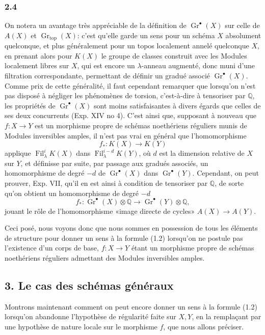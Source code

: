 \documentclass[11pt]{article}
\newcommand{\Gr}{\operatorname{Gr}}
\newcommand{\Fil}{\operatorname{Fil}}
\begin{document}
\subsubsection*{2.4}
On notera un avantage très appréciable de la définition de $\Gr^\bullet(X)$ sur celle de $A(X)$ et $\Gr_{\mathrm{top}}(X)$: c'est qu'elle garde un sens pour un schéma $X$ absolument quelconque, et plus généralement pour un topos localement annelé quelconque $X$, en prenant alors pour $K(X)$ le groupe de classes construit avec les Modules localement libres sur $X$, qui est encore un $\lambda$-anneau augmenté, donc muni d'une filtration correspondante, permettant de définir un gradué associé $\Gr^\bullet(X)$. Comme prix de cette généralité, il faut cependant remarquer que lorsqu'on n'est pas disposé à négliger les phénomènes de torsion, c'est-à-dire à tensoriser par $\mathbb Q$, les propriétés de $\Gr^\bullet(X)$ sont moins satisfaisantes à divers égards que celles de ses deux concurrents (Exp. XIV no 4). C'est ainsi que, supposant à nouveau que $f:X\to Y$ est un morphisme propre de schémas noethériens réguliers munis de Modules inversibles amples, il n'est pas vrai en général que l'homomorphisme
\[
f_*:K(X)\longrightarrow K(Y)
\]
applique $\Fil^i_\lambda K(X)$ dans $\Fil^{i-d}_\lambda K(Y)$, où $d$ est la dimension relative de $X$ sur $Y$, et définisse par suite, par passage aux gradués associés, un homomorphisme de degré $-d$ de $\Gr^\bullet(X)$ dans $\Gr^\bullet(Y)$. Cependant, on peut prouver, Exp. VII, qu'il en est ainsi à condition de tensoriser par $\mathbb Q$, de sorte qu'on obtient un homomorphisme de degré $-d$
\begin{equation}\tag{2.5}
f_*:\Gr^\bullet(X)\otimes\mathbb Q\longrightarrow \Gr^\bullet(Y)\otimes\mathbb Q,
\end{equation}
jouant le rôle de l'homomorphisme «image directe de cycles» $A(X)\to A(Y)$.

Ceci posé, nous voyons donc que nous sommes en possession de tous les éléments de structure pour donner un sens à la formule (1.2) lorsqu'on ne postule pas l'existence d'un corps de base, $f:X\to Y$ étant un morphisme propre de schémas noethériens réguliers admettant des Modules inversibles amples.

\subsection*{3. Le cas des schémas généraux}
Montrons maintenant comment on peut encore donner un sens à la formule (1.2) lorsqu'on abandonne l'hypothèse de régularité faite sur $X,Y$, en la remplaçant par une hypothèse de nature locale sur le morphisme $f$, que nous allons préciser.
\end{document}
